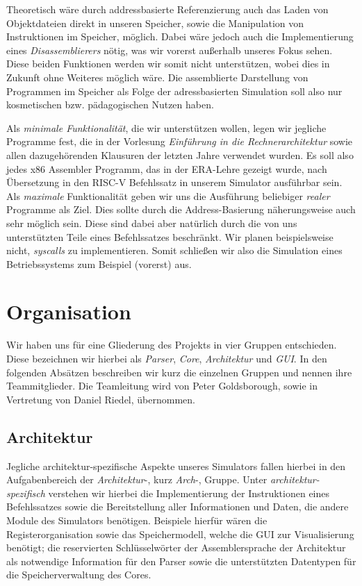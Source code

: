 Theoretisch wäre durch addressbasierte Referenzierung auch das Laden von
Objektdateien direkt in unseren Speicher, sowie die Manipulation von
Instruktionen im Speicher, möglich. Dabei wäre jedoch auch die Implementierung
eines \emph{Disassemblierers} nötig, was wir vorerst außerhalb unseres Fokus
sehen. Diese beiden Funktionen werden wir somit nicht unterstützen, wobei dies
in Zukunft ohne Weiteres möglich wäre. Die assemblierte Darstellung von
Programmen im Speicher als Folge der adressbasierten Simulation soll also nur
kosmetischen bzw. pädagogischen Nutzen haben.

Als \emph{minimale Funktionalität}, die wir unterstützen wollen, legen wir
jegliche Programme fest, die in der Vorlesung \emph{Einführung in die
  Rechnerarchitektur} sowie allen dazugehörenden Klausuren der letzten Jahre
verwendet wurden. Es soll also jedes x86 Assembler Programm, das in der
ERA-Lehre gezeigt wurde, nach Übersetzung in den RISC-V Befehlssatz in unserem
Simulator ausführbar sein. Als \emph{maximale} Funktionalität geben wir uns die
Ausführung beliebiger \emph{realer} Programme als Ziel. Dies sollte durch die
Address-Basierung näherungsweise auch sehr möglich sein. Diese sind dabei aber
natürlich durch die von uns unterstützten Teile eines Befehlssatzes
beschränkt. Wir planen beispielsweise nicht, \emph{syscalls} zu
implementieren. Somit schließen wir also die Simulation eines Betriebssystems
zum Beispiel (vorerst) aus.

\section{Organisation}

Wir haben uns für eine Gliederung des Projekts in vier Gruppen entschieden.
Diese bezeichnen wir hierbei als \emph{Parser}, \emph{Core}, \emph{Architektur}
und \emph{GUI}. In den folgenden Absätzen beschreiben wir kurz die einzelnen
Gruppen und nennen ihre Teammitglieder. Die Teamleitung wird von Peter
Goldsborough, sowie in Vertretung von Daniel Riedel, übernommen.

\subsection{Architektur}

Jegliche architektur-spezifische Aspekte
unseres Simulators fallen hierbei in den Aufgabenbereich der
\emph{Architektur}-, kurz \emph{Arch}-, Gruppe. Unter
\emph{architektur-spezifisch} verstehen wir hierbei die Implementierung der
Instruktionen eines Befehlssatzes sowie die Bereitstellung aller Informationen
und Daten, die andere Module des Simulators benötigen. Beispiele hierfür wären
die Registerorganisation sowie das Speichermodell, welche die GUI zur
Visualisierung benötigt; die reservierten Schlüsselwörter der Assemblersprache
der Architektur als notwendige Information für den Parser sowie die
unterstützten Datentypen für die Speicherverwaltung des Cores.

